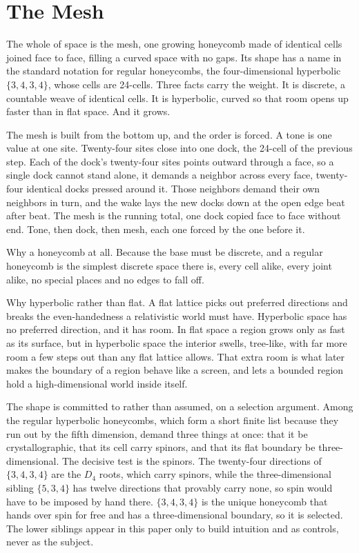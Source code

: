 \section{The Mesh}

The whole of space is the mesh, one growing honeycomb made of identical cells joined face to face, filling a curved space with no gaps. Its shape has a name in the standard notation for regular honeycombs, the four-dimensional hyperbolic $\{3,4,3,4\}$, whose cells are 24-cells. Three facts carry the weight. It is discrete, a countable weave of identical cells. It is hyperbolic, curved so that room opens up faster than in flat space. And it grows.

The mesh is built from the bottom up, and the order is forced. A tone is one value at one site. Twenty-four sites close into one dock, the 24-cell of the previous step. Each of the dock's twenty-four sites points outward through a face, so a single dock cannot stand alone, it demands a neighbor across every face, twenty-four identical docks pressed around it. Those neighbors demand their own neighbors in turn, and the wake lays the new docks down at the open edge beat after beat. The mesh is the running total, one dock copied face to face without end. Tone, then dock, then mesh, each one forced by the one before it.

Why a honeycomb at all. Because the base must be discrete, and a regular honeycomb is the simplest discrete space there is, every cell alike, every joint alike, no special places and no edges to fall off.

Why hyperbolic rather than flat. A flat lattice picks out preferred directions and breaks the even-handedness a relativistic world must have. Hyperbolic space has no preferred direction, and it has room. In flat space a region grows only as fast as its surface, but in hyperbolic space the interior swells, tree-like, with far more room a few steps out than any flat lattice allows. That extra room is what later makes the boundary of a region behave like a screen, and lets a bounded region hold a high-dimensional world inside itself.

The shape is committed to rather than assumed, on a selection argument. Among the regular hyperbolic honeycombs, which form a short finite list because they run out by the fifth dimension, demand three things at once: that it be crystallographic, that its cell carry spinors, and that its flat boundary be three-dimensional. The decisive test is the spinors. The twenty-four directions of $\{3,4,3,4\}$ are the $D_4$ roots, which carry spinors, while the three-dimensional sibling $\{5,3,4\}$ has twelve directions that provably carry none, so spin would have to be imposed by hand there. $\{3,4,3,4\}$ is the unique honeycomb that hands over spin for free and has a three-dimensional boundary, so it is selected. The lower siblings appear in this paper only to build intuition and as controls, never as the subject.

